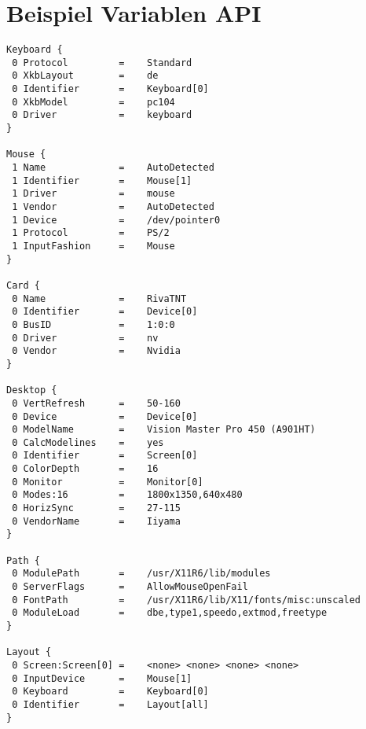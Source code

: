\section{Beispiel Variablen API}
\begin{small}
\begin{verbatim}
Keyboard {
 0 Protocol         =    Standard
 0 XkbLayout        =    de
 0 Identifier       =    Keyboard[0]
 0 XkbModel         =    pc104
 0 Driver           =    keyboard
}

Mouse {
 1 Name             =    AutoDetected
 1 Identifier       =    Mouse[1]
 1 Driver           =    mouse
 1 Vendor           =    AutoDetected
 1 Device           =    /dev/pointer0
 1 Protocol         =    PS/2
 1 InputFashion     =    Mouse
}

Card {
 0 Name             =    RivaTNT
 0 Identifier       =    Device[0]
 0 BusID            =    1:0:0
 0 Driver           =    nv
 0 Vendor           =    Nvidia
}

Desktop {
 0 VertRefresh      =    50-160
 0 Device           =    Device[0]
 0 ModelName        =    Vision Master Pro 450 (A901HT)
 0 CalcModelines    =    yes
 0 Identifier       =    Screen[0]
 0 ColorDepth       =    16
 0 Monitor          =    Monitor[0]
 0 Modes:16         =    1800x1350,640x480
 0 HorizSync        =    27-115
 0 VendorName       =    Iiyama
}

Path {
 0 ModulePath       =    /usr/X11R6/lib/modules
 0 ServerFlags      =    AllowMouseOpenFail
 0 FontPath         =    /usr/X11R6/lib/X11/fonts/misc:unscaled
 0 ModuleLoad       =    dbe,type1,speedo,extmod,freetype
}

Layout {
 0 Screen:Screen[0] =    <none> <none> <none> <none>
 0 InputDevice      =    Mouse[1]
 0 Keyboard         =    Keyboard[0]
 0 Identifier       =    Layout[all]
}
\end{verbatim}
\end{small}

